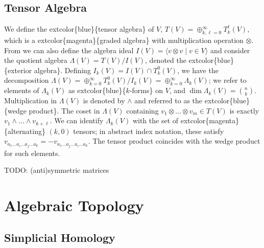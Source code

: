 \documentclass[
]{book}
\begin{document}
\hypertarget{tensor-algebra}{%
\section{Tensor Algebra}\label{tensor-algebra}}

We define the extcolor\{blue\}\{tensor algebra\} of \(V\), \(T(V) = \oplus_{k,\ell = 0}^\infty T_k^\ell(V)\), which is a extcolor\{magenta\}\{graded algebra\} with multiplication operation \(\otimes\). From we can also define the algebra ideal \(I(V) = \langle v \otimes v \; | \; v \in V\rangle\) and consider the quotient algebra \(\Lambda(V) = T(V) / I(V)\), denoted the extcolor\{blue\}\{exterior algebra\}. Defining \(I_k(V) = I(V) \cap T_k^0(V)\), we have the decomposition \(\Lambda(V) = \oplus_{k=0}^\infty T_k^0(V)/I_k(V) = \oplus_{k=0}^\infty \Lambda_k(V)\); we refer to elements of \(\Lambda_k(V)\) as extcolor\{blue\}\{\(k\)-forms\} on \(V\), and \(\dim \Lambda_k(V) = \binom{n}{k}\). Multiplication in \(\Lambda(V)\) is denoted by \(\wedge\) and referred to as the extcolor\{blue\}\{wedge product\}. The coset in \(\Lambda(V)\) containing \(v_1 \otimes \dots \otimes v_{m} \in T(V)\) is exactly \(v_1 \wedge \dots \wedge v_{k+\ell}\). We can identify \(\Lambda_k(V)\) with the set of extcolor\{magenta\}\{alternating\} \((k,0)\) tensors; in abstract index notation, these satisfy \(v_{a_1\dots a_i \dots a_j \dots a_k} = -v_{a_1\dots a_j \dots a_i \dots a_k}\). The tensor product coincides with the wedge product for such elements.

TODO: (anti)symmetric matrices

\hypertarget{algebraic-topology}{%
\chapter{Algebraic Topology}\label{algebraic-topology}}

\hypertarget{simplicial-homology}{%
\section{Simplicial Homology}\label{simplicial-homology}}
\end{document}
